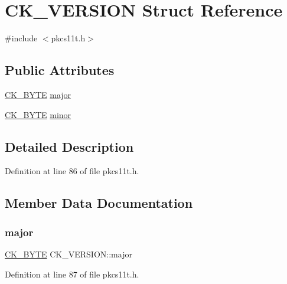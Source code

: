 \hypertarget{struct_c_k___v_e_r_s_i_o_n}{}\section{C\+K\+\_\+\+V\+E\+R\+S\+I\+ON Struct Reference}
\label{struct_c_k___v_e_r_s_i_o_n}


{\ttfamily \#include $<$pkcs11t.\+h$>$}

\subsection*{Public Attributes}
\begin{DoxyCompactItemize}
\item 
\hyperlink{pkcs11t_8h_a51e605f881c86838bf12d70707b57b85}{C\+K\+\_\+\+B\+Y\+TE} \hyperlink{struct_c_k___v_e_r_s_i_o_n_ac66d4dfdec725c04681bdbb6f64f490a}{major}
\item 
\hyperlink{pkcs11t_8h_a51e605f881c86838bf12d70707b57b85}{C\+K\+\_\+\+B\+Y\+TE} \hyperlink{struct_c_k___v_e_r_s_i_o_n_a00a75bcce8f80272abfeb9f8ffc0030c}{minor}
\end{DoxyCompactItemize}


\subsection{Detailed Description}


Definition at line 86 of file pkcs11t.\+h.



\subsection{Member Data Documentation}
\mbox{\label{struct_c_k___v_e_r_s_i_o_n_ac66d4dfdec725c04681bdbb6f64f490a}} 
\subsubsection{\texorpdfstring{major}{major}}
{\footnotesize\ttfamily \hyperlink{pkcs11t_8h_a51e605f881c86838bf12d70707b57b85}{C\+K\+\_\+\+B\+Y\+TE} C\+K\+\_\+\+V\+E\+R\+S\+I\+O\+N\+::major}



Definition at line 87 of file pkcs11t.\+h.

